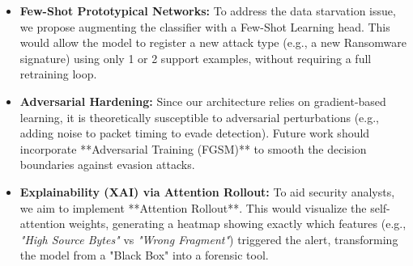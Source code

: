\documentclass[
  10pt,
  twocolumn,
  a4paper,
  parskip=half
]{scrartcl}
\begin{document}
    \begin{itemize}
        \item \textbf{Few-Shot Prototypical Networks:}
        To address the data starvation issue, we propose augmenting the classifier with a Few-Shot Learning head. This would allow the model to register a new attack type (e.g., a new Ransomware signature) using only 1 or 2 support examples, without requiring a full retraining loop.

        \item \textbf{Adversarial Hardening:}
        Since our architecture relies on gradient-based learning, it is theoretically susceptible to adversarial perturbations (e.g., adding noise to packet timing to evade detection). Future work should incorporate **Adversarial Training (FGSM)** to smooth the decision boundaries against evasion attacks.

        \item \textbf{Explainability (XAI) via Attention Rollout:}
        To aid security analysts, we aim to implement **Attention Rollout**. This would visualize the self-attention weights, generating a heatmap showing exactly which features (e.g., \textit{"High Source Bytes"} vs \textit{"Wrong Fragment"}) triggered the alert, transforming the model from a "Black Box" into a forensic tool.
    \end{itemize}
\end{document}
